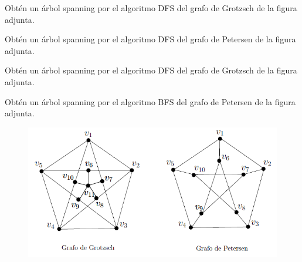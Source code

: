 \documentclass[twoside]{article}
\begin{document}
\newpage

\begin{ejercicio}{1.8}
Obtén un árbol spanning por el algoritmo DFS del grafo de Grotzsch de la figura adjunta.
\end{ejercicio}
\begin{solucion}





\end{solucion}
\newpage

\begin{ejercicio}{1.9}
Obtén un árbol spanning por el algoritmo DFS del grafo de Petersen de la figura adjunta.
\end{ejercicio}
\begin{solucion}

\end{solucion}
\newpage

\begin{ejercicio}{1.10}
Obtén un árbol spanning por el algoritmo DFS del grafo de Grotzsch de la figura adjunta.
\end{ejercicio}
\begin{solucion}

\end{solucion}

\newpage

\begin{ejercicio}{1.11}
Obtén un árbol spanning por el algoritmo BFS del grafo de Petersen de la figura adjunta.
\end{ejercicio}
\begin{solucion}



\end{solucion}

\newpage

\begin{figure}[h!]
\includegraphics[scale=0.8]{Rel1}
\end{figure}
%
%
%
%
\end{document}
